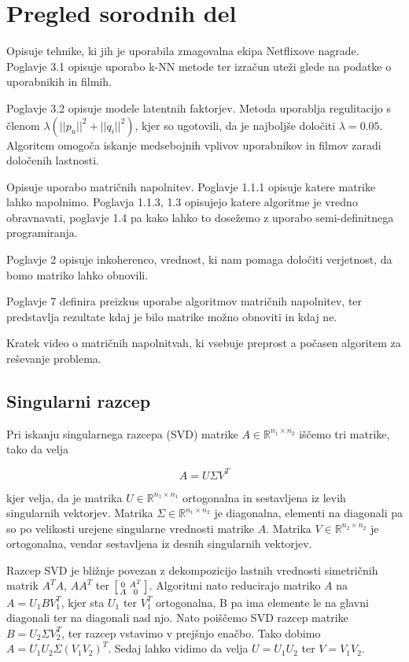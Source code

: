 \chapter{Pregled sorodnih del}


\cite{BK07} Opisuje tehnike, ki jih je uporabila zmagovalna ekipa Netflixove nagrade.
Poglavje 3.1 opisuje uporabo k-NN metode ter izračun uteži glede na podatke o uporabnikih in filmih.

Poglavje 3.2 opisuje modele latentnih faktorjev. Metoda uporablja regulitacijo 
s členom $\lambda (||p_u||^2 + ||q_i||^2)$, kjer so ugotovili,
da je najboljše določiti $\lambda=0.05$. Algoritem omogoča iskanje medsebojnih vplivov
uporabnikov in filmov zaradi določenih lastnosti.

\cite{CR08} Opisuje uporabo matričnih napolnitev.
Poglavje 1.1.1 opisuje katere matrike lahko napolnimo.
Poglavja 1.1.3, 1.3 opisujejo katere algoritme je vredno obravnavati, poglavje 1.4 pa kako lahko to dosežemo z uporabo semi-definitnega programiranja.

Poglavje 2 opisuje inkoherenco, vrednost, ki nam pomaga določiti verjetnost,
da bomo matriko lahko obnovili.

Poglavje 7 definira preizkus uporabe algoritmov matričnih napolnitev,
ter predstavlja rezultate kdaj je bilo matrike možno obnoviti in kdaj ne.

\cite{VV20} Kratek video o matričnih napolnitvah, ki vsebuje preprost a počasen algoritem 
za reševanje problema.

\section{Singularni razcep}

Pri iskanju singularnega razcepa (SVD) matrike $A \in \mathbb{R}^{n_1 \times n_2}$ iščemo tri matrike, tako da velja

\[
A = U \Sigma V^T
\]

kjer velja, da je matrika $U \in \mathbb{R}^{n_1 \times n_1}$ ortogonalna in sestavljena iz levih singularnih vektorjev. Matrika $\Sigma \in \mathbb{R}^{n_1 \times n_2}$ je diagonalna, elementi na diagonali pa so po velikosti urejene singularne vrednosti matrike $A$. Matrika $V \in \mathbb{R}^{n_2 \times n_2}$ je ortogonalna, vendar sestavljena iz desnih singularnih vektorjev. 

Razcep SVD je bližnje povezan z dekompozicijo lastnih vrednosti simetričnih matrik $A^T A$, $A A^T$ ter 
$\begin{bsmallmatrix}
  0 & A^T\\
  A & 0
\end{bsmallmatrix}$.
Algoritmi nato reducirajo matriko $A$  na $A = U_1BV_1^T$, kjer sta $U_1$ ter $V_1^T$ ortogonalna, B pa ima elemente le na glavni diagonali ter na diagonali nad njo. Nato poiščemo SVD razcep matrike $B = U_2 \Sigma V_2^T$, ter razcep vstavimo v prejšnjo enačbo. Tako dobimo $A = U_1U_2 \Sigma (V_1V_2)^T$. Sedaj lahko vidimo da velja $U = U_1U_2$ ter $V = V_1V_2$.\cite{demmel97}